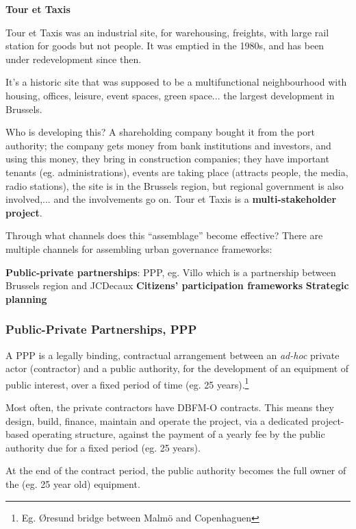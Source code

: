 \documentclass{article}
\begin{document}
\textbf{Tour et Taxis}

Tour et Taxis was an industrial site, for warehousing, freights, with large rail station for goods but not people. It was emptied in the 1980s, and has been under redevelopment since then.

It's a historic site that was supposed to be a multifunctional neighbourhood with housing, offices, leisure, event spaces, green space... the largest development in Brussels.

Who is developing this? A shareholding company bought it from the port authority; the company gets money from bank institutions and investors, and using this money, they bring in construction companies; they have important tenants (eg. administrations), events are taking place (attracts people, the media, radio stations), the site is in the Brussels region, but regional government is also involved,... and the involvements go on. Tour et Taxis is a \textbf{multi-stakeholder project}.

Through what channels does this ``assemblage'' become effective? There are multiple channels for assembling urban governance frameworks:

\begin{outline}
	\1 \textbf{Public-private partnerships}: PPP, eg. Villo which is a partnership between Brussels region and JCDecaux
	\1 \textbf{Citizens' participation frameworks}
	\1 \textbf{Strategic planning}
\end{outline}

\subsubsection{Public-Private Partnerships, PPP}

A PPP is a legally binding, contractual arrangement between an \textit{ad-hoc} private actor (contractor) and a public authority, for the development of an equipment of public interest, over a fixed period of time (eg. 25 years).\footnote{Eg. Øresund bridge between Malmö and Copenhaguen}
 
Most often, the private contractors have DBFM-O contracts. This means they design, build, finance, maintain and operate the project, via a dedicated project-based operating structure, against the payment of a yearly fee by the public authority due for a fixed period (eg. 25 years).

At the end of the contract period, the public authority becomes the full owner of the (eg. 25 year old) equipment.
\end{document}
